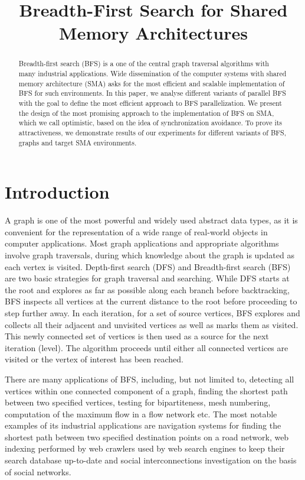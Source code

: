\documentclass[letterpaper]{article}
\title{Breadth-First Search for Shared Memory Architectures}
\begin{document}
	\maketitle

	\begin{abstract} 
		Breadth-first search (BFS) is a one of the central graph traversal algorithms with many industrial applications.
		Wide dissemination of the computer systems with shared memory architecture (SMA) asks for the most efficient and scalable implementation of BFS for such environments. 
		In this paper, we analyse different variants of parallel BFS with the goal to define the most efficient approach to BFS parallelization.
		We present the design of the most promising approach to the implementation of BFS on SMA, which we call optimistic, based on the idea of synchronization avoidance.
		To prove its attractiveness, we demonstrate results of our experiments for different variants of BFS, graphs and target SMA environments.
	\end{abstract}

	\section{Introduction}\label{sec:intro} %
		A graph is one of the most powerful and widely used abstract data types, as it is convenient for the representation of a wide range of real-world objects in computer applications.
		Most graph applications and appropriate algorithms involve graph traversals, during which knowledge about the graph is updated as each vertex is visited. 
		Depth-first search (DFS) and Breadth-first search (BFS) are two basic strategies for graph traversal and searching.
		While DFS starts at the root and explores as far as possible along each branch before backtracking, BFS inspects all vertices at the current distance to the root before proceeding to step further away. 
		In each iteration, for a set of source vertices, BFS explores and collects all their adjacent and unvisited vertices as well as marks them as visited.  
		This newly connected set of vertices is then used as a source for the next iteration (level).
		The algorithm proceeds until either all connected vertices are visited or the vertex of interest has been reached.
		
		There are many applications of BFS, including, but not limited to, detecting all vertices within one connected component of a graph, finding the shortest path between two specified vertices, testing for bipartiteness, mesh numbering, computation of the maximum flow in a flow network etc.
		The most notable examples of its industrial applications are navigation systems for finding the shortest path between two specified destination points on a road network, web indexing performed by web crawlers used by web search engines to keep their search database up-to-date and social interconnections investigation on the basis of social networks. 
		
\end{document}
